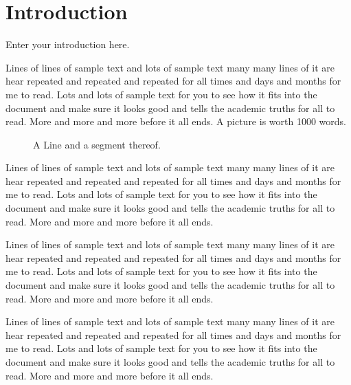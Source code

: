  
\chapter{Introduction}


Enter your introduction here.


Lines of lines of sample text and lots of sample text many many lines
of it are hear repeated and repeated and repeated for all times and days
and months for me to read.  Lots and lots of sample text for you to
see how it fits into the document and make sure it looks good and
tells the academic truths for all to read.  More and more and more
before it all ends. A picture is worth 1000 words.

\begin{figure}
  \begin{center}
    
  \end{center}
  \caption{A Line and a segment thereof.}
\end{figure}


Lines of lines of sample text and lots of sample text many many lines
of it are hear repeated and repeated and repeated for all times and days
and months for me to read.  Lots and lots of sample text for you to
see how it fits into the document and make sure it looks good and
tells the academic truths for all to read.  More and more and more
before it all ends.  

Lines of lines of sample text and lots of sample text many many lines
of it are hear repeated and repeated and repeated for all times and days
and months for me to read.  Lots and lots of sample text for you to
see how it fits into the document and make sure it looks good and
tells the academic truths for all to read.  More and more and more
before it all ends.  

Lines of lines of sample text and lots of sample text many many lines
of it are hear repeated and repeated and repeated for all times and days
and months for me to read.  Lots and lots of sample text for you to
see how it fits into the document and make sure it looks good and
tells the academic truths for all to read.  More and more and more
before it all ends.  

